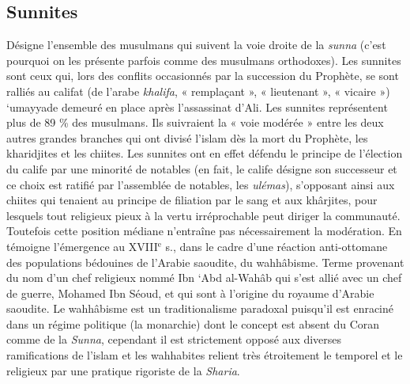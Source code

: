 
\subsection{Sunnites}
Désigne l’ensemble des musulmans
qui suivent la voie droite de la
{\it sunna} (c’est pourquoi on les présente parfois
comme des musulmans orthodoxes).
Les sunnites sont ceux qui, lors des
conflits occasionnés par la succession du
Prophète, se sont ralliés au califat (de
l'arabe {\it khalifa}, « remplaçant », « lieutenant »,
« vicaire ») ‘umayyade demeuré
en place après l’assassinat d’Ali. Les sunnites
représentent plus de 89 \% des
musulmans. Ils suivraient la « voie modérée »
entre les deux autres grandes
branches qui ont divisé l'islam dès la mort
du Prophète, les kharidjites et les chiites.
Les sunnites ont en effet défendu le principe
de l'élection du calife par une minorité
de notables (en fait, le calife désigne
son successeur et ce choix est ratifié par
l'assemblée de notables, les {\it ulémas}), s'opposant
ainsi aux chiites qui tenaient au
principe de filiation par le sang et aux
khârjites, pour lesquels tout religieux
pieux à la vertu irréprochable peut diriger
la communauté. Toutefois cette position
médiane n’entraîne pas nécessairement la
modération. En témoigne l’émergence au
{\footnotesize XVIII}$^\text{e}$ s., dans le cadre d’une réaction
anti-ottomane des populations bédouines de
l’Arabie saoudite, du wahhâbisme. Terme
provenant du nom d’un chef religieux
nommé Ibn ‘Abd al-Wahâb qui s’est allié
avec un chef de guerre, Mohamed Ibn
Séoud, et qui sont à l’origine du royaume
d’Arabie saoudite. Le wahhâbisme est un
traditionalisme paradoxal puisqu'il est
enraciné dans un régime politique (la
monarchie) dont le concept est absent du
Coran comme de la {\it Sunna}, cependant il
est strictement opposé aux diverses ramifications
de l'islam et les wahhabites
relient très étroitement le temporel et le
religieux par une pratique rigoriste de la
{\it Sharia}.

